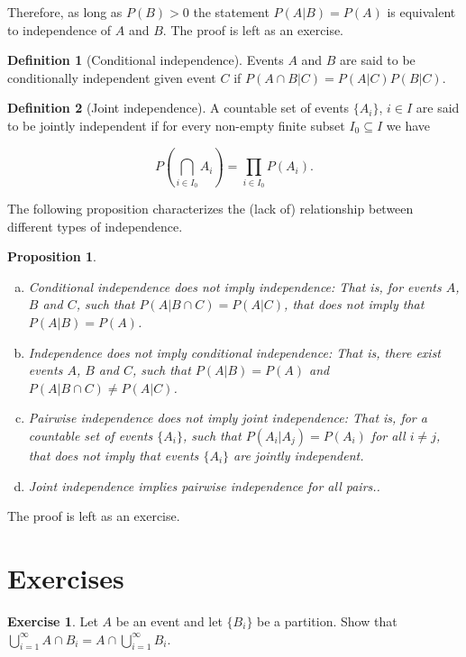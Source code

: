 \documentclass{book}
\theoremstyle{plain}%
\newtheorem{proposition}{Proposition}[section]
\theoremstyle{definition}
\newtheorem{definition}{Definition}[section]
\newtheorem{exercise}{Exercise}[chapter]
\begin{document}
Therefore, as long as $P(B) > 0$ the statement $P(A|B) = P(A)$ is equivalent to independence of $A$ and $B$. The proof is left as an exercise.

\begin{definition}[Conditional independence]
Events $A$ and $B$ are said to be conditionally independent given event $C$ if $P(A \cap B|C) = P(A|C)P(B|C)$.
\end{definition}

\begin{definition}[Joint independence]
A countable set of events $\{A_i\}$, $i \in I$ are said to be jointly independent if for every non-empty finite subset $I_0 \subseteq I$ we have

$$\displaystyle P(\bigcap_{i \in I_0} A_i) = \prod_{i \in I_0} P(A_i).$$
\end{definition}

The following proposition characterizes the (lack of) relationship between different types of independence.

\begin{proposition}
\text{ }
\vspace{0.0cm}
\begin{enumerate}[(a)]
\item \emph{Conditional independence does not imply independence}: That is, for events $A$, $B$ and $C$, such that $P(A|B \cap C) = P(A|C)$, that does not imply that $P(A|B) = P(A)$.
\item \emph{Independence does not imply conditional independence}: That is, there exist events $A$, $B$ and $C$, such that $P(A|B) = P(A)$ and $P(A|B \cap C) \neq P(A|C)$.
\item \emph{Pairwise independence does not imply joint independence}: That is, for a countable set of events $\{A_i\}$, such that $P(A_i|A_j) = P(A_i)$ for all $i \neq j$, that does not imply that events $\{A_i\}$ are jointly independent.
\item \emph{Joint independence implies pairwise independence for all pairs.}.
\end{enumerate}\label{prop:independence}
\end{proposition}

The proof is left as an exercise.

\section*{Exercises}

\begin{exercise}
Let $A$ be an event and let $\{B_i\}$ be a partition. Show that
$\bigcup_{i=1}^\infty A \cap B_i = A \cap \bigcup_{i=1}^\infty B_i$.
\end{exercise}
\end{document}
